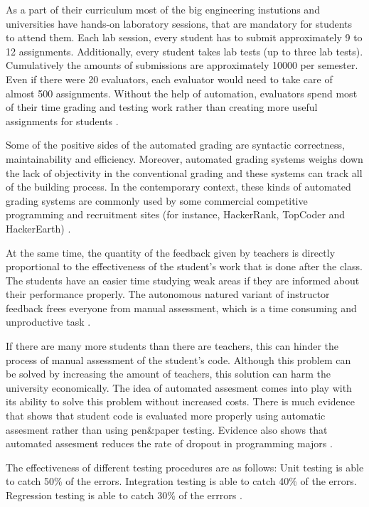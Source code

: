 \documentclass[a4paper, 12pt]{article}
\begin{document}
    As a part of their curriculum most of the big engineering instutions and universities have hands-on laboratory sessions, that are mandatory
    for students to attend them. Each lab session, every student has to submit approximately 9 to 12 assignments. Additionally, every student takes lab tests (up to three lab tests).
    Cumulatively the amounts of submissions are approximately 10000 per semester. Even if there were 20 evaluators, each evaluator would need to take care of almost 500 assignments.
    Without the help of automation, evaluators spend most of their time grading and testing work rather than creating more useful assignments for students \cite{Mandal2007}.

    Some of the positive sides of the automated grading are syntactic correctness, maintainability and efficiency.
    Moreover, automated grading systems weighs down the lack of objectivity in the conventional grading and these systems
    can track all of the building process. In the contemporary context, these kinds of automated grading systems are commonly used by
    some commercial competitive programming and recruitment sites (for instance, HackerRank, TopCoder and HackerEarth) \cite{RestrepoCalle2018}.

    At the same time, the quantity of the feedback given by teachers is directly proportional to the effectiveness of the student's work that is done
    after the class. The students have an easier time studying weak areas if they are informed about their
    performance properly. The autonomous natured variant of instructor feedback frees everyone from manual assessment,
    which is a time consuming and unproductive task \cite{RestrepoCalle2018-2}.
    
    If there are many more students than there are teachers, this can hinder the process of manual assessment of the student's code.
    Although this problem can be solved by increasing the amount of teachers, this solution can harm the university economically.
    The idea of automated assesment comes into play with its ability to solve this problem without increased costs.
    There is much evidence that shows that student code is evaluated more properly using automatic assesment rather than using pen\&paper testing.
    Evidence also shows that automated assesment reduces the rate of dropout in programming majors \cite{Gordillo2019}.

    The effectiveness of different testing procedures are as follows:
    Unit testing is able to catch 50\% of the errors.
    Integration testing is able to catch 40\% of the errors.
    Regression testing is able to catch 30\% of the errrors \cite{Fenton2018}.
\end{document}
